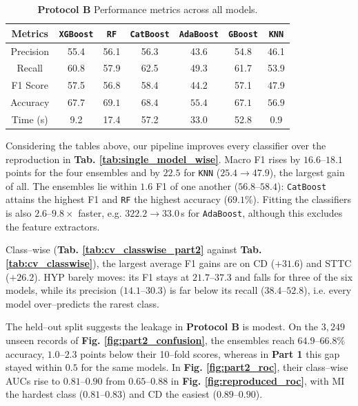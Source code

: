 \begin{table}[H]
    \centering
    \caption{\textbf{Protocol B} Performance metrics across all models.}
    \label{tab:single_model_wise_part2}
    \begin{tabular}{ccccccc}
        \toprule
        Metrics & \texttt{XGBoost} & \texttt{RF} & \texttt{CatBoost} & \texttt{AdaBoost} & \texttt{GBoost} & \texttt{KNN} \\
        \midrule
        Precision & 55.4 & 56.1 & 56.3 & 43.6 & 54.8 & 46.1 \\
        Recall & 60.8 & 57.9 & 62.5 & 49.3 & 61.7 & 53.9 \\
        F1 Score & 57.5 & 56.8 & 58.4 & 44.2 & 57.1 & 47.9 \\
        Accuracy & $67.7$ & $69.1$ & $68.4$ & $55.4$ & $67.1$ & $56.9$ \\
        \midrule
        \midrule
        Time (s) & 9.2 & 17.4 & 57.2 & 33.0 & 52.8 & 0.9 \\
        \bottomrule
    \end{tabular}
\end{table}

Considering the tables above, our pipeline improves every classifier over the reproduction in \textbf{Tab. \ref{tab:single_model_wise}}.
Macro F1 rises by $16.6$–$18.1$ points for the four ensembles and by $22.5$ for \texttt{KNN} ($25.4 \rightarrow 47.9$), the largest gain of all.
The ensembles lie within $1.6$ F1 of one another ($56.8$–$58.4$): \texttt{CatBoost} attains the highest F1 and \texttt{RF} the highest accuracy ($69.1\%$).
Fitting the classifiers is also $2.6$–$9.8\times$ faster, e.g. $322.2 \rightarrow 33.0$\,s for \texttt{AdaBoost}, although this excludes the feature extractors.

Class–wise (\textbf{Tab. \ref{tab:cv_classwise_part2}} against \textbf{Tab. \ref{tab:cv_classwise}}), the largest average F1 gains are on CD ($+31.6$) and STTC ($+26.2$).
HYP barely moves: its F1 stays at $21.7$–$37.3$ and falls for three of the six models, while its precision ($14.1$–$30.3$) is far below its recall ($38.4$–$52.8$), i.e. every model over–predicts the rarest class.

The held–out split suggests the leakage in \textbf{Protocol B} is modest.
On the $3{,}249$ unseen records of \textbf{Fig. \ref{fig:part2_confusion}}, the ensembles reach $64.9$–$66.8\%$ accuracy, $1.0$–$2.3$ points below their 10–fold scores, whereas in \textbf{Part 1} this gap stayed within $0.5$ for the same models.
In \textbf{Fig. \ref{fig:part2_roc}}, their class–wise AUCs rise to $0.81$–$0.90$ from $0.65$–$0.88$ in \textbf{Fig. \ref{fig:reproduced_roc}}, with MI the hardest class ($0.81$–$0.83$) and CD the easiest ($0.89$–$0.90$).


